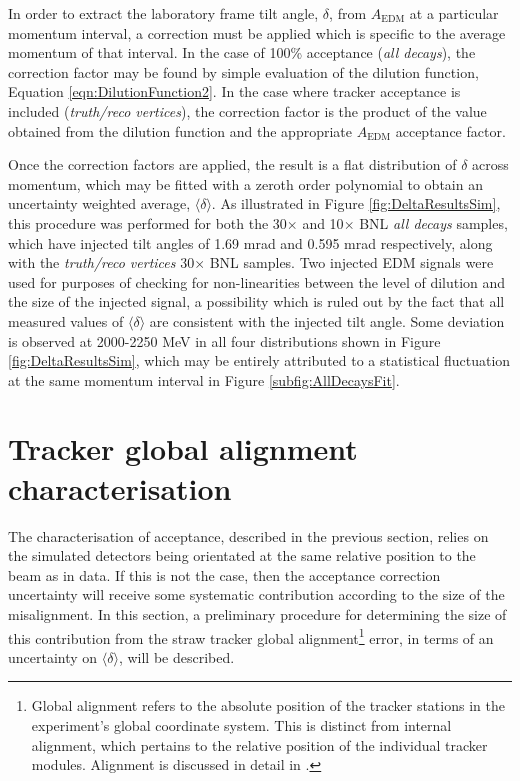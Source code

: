 In order to extract the laboratory frame tilt angle, $\delta$, from $A_{\text{EDM}}$ at a particular momentum interval, a correction must be applied which is specific to the average momentum of that interval. In the case of 100\% acceptance (\textit{all decays}), the correction factor may be found by simple evaluation of the dilution function, Equation \ref{eqn:DilutionFunction2}. In the case where tracker acceptance is included (\textit{truth/reco vertices}), the correction factor is the product of the value obtained from the dilution function and the appropriate $A_{\text{EDM}}$ acceptance factor. 

Once the correction factors are applied, the result is a flat distribution of $\delta$ across momentum, which may be fitted with a zeroth order polynomial to obtain an uncertainty weighted average, $\langle \delta \rangle$. As illustrated in Figure \ref{fig:DeltaResultsSim}, this procedure was performed for both the 30$\times$ and 10$\times$ BNL \textit{all decays} samples, which have injected tilt angles of 1.69 mrad and 0.595 mrad respectively, along with the \textit{truth/reco vertices} 30$\times$ BNL samples. Two injected EDM signals were used for purposes of checking for non-linearities between the level of dilution and the size of the injected signal, a possibility which is ruled out by the fact that all measured values of $\langle \delta \rangle$ are consistent with the injected tilt angle. Some deviation is observed at 2000-2250 MeV in all four distributions shown in Figure \ref{fig:DeltaResultsSim}, which may be entirely attributed to a statistical fluctuation at the same momentum interval in Figure \ref{subfig:AllDecaysFit}.

\section{Tracker global alignment characterisation}\label{sec:Alignment}

The characterisation of acceptance, described in the previous section, relies on the simulated detectors being orientated at the same relative position to the beam as in data. If this is not the case, then the acceptance correction uncertainty will receive some systematic contribution according to the size of the misalignment. In this section, a preliminary procedure for determining the size of this contribution from the straw tracker global alignment\footnote{Global alignment refers to the absolute position of the tracker stations in the experiment’s global coordinate system. This is distinct from internal alignment, which pertains to the relative position of the individual tracker modules. Alignment is discussed in detail in \cite{Lukicov}.} error, in terms of an uncertainty on $\langle \delta \rangle$, will be described. 

